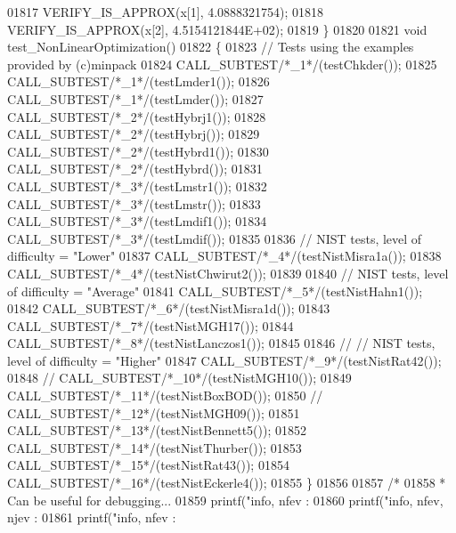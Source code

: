 \begin{DoxyCode}
01817   VERIFY\_IS\_APPROX(x[1], 4.0888321754);
01818   VERIFY\_IS\_APPROX(x[2], 4.5154121844E+02);
01819 \}
01820 
01821 \textcolor{keywordtype}{void} test\_NonLinearOptimization()
01822 \{
01823     \textcolor{comment}{// Tests using the examples provided by (c)minpack}
01824     CALL\_SUBTEST\textcolor{comment}{/*\_1*/}(testChkder());
01825     CALL\_SUBTEST\textcolor{comment}{/*\_1*/}(testLmder1());
01826     CALL\_SUBTEST\textcolor{comment}{/*\_1*/}(testLmder());
01827     CALL\_SUBTEST\textcolor{comment}{/*\_2*/}(testHybrj1());
01828     CALL\_SUBTEST\textcolor{comment}{/*\_2*/}(testHybrj());
01829     CALL\_SUBTEST\textcolor{comment}{/*\_2*/}(testHybrd1());
01830     CALL\_SUBTEST\textcolor{comment}{/*\_2*/}(testHybrd());
01831     CALL\_SUBTEST\textcolor{comment}{/*\_3*/}(testLmstr1());
01832     CALL\_SUBTEST\textcolor{comment}{/*\_3*/}(testLmstr());
01833     CALL\_SUBTEST\textcolor{comment}{/*\_3*/}(testLmdif1());
01834     CALL\_SUBTEST\textcolor{comment}{/*\_3*/}(testLmdif());
01835 
01836     \textcolor{comment}{// NIST tests, level of difficulty = "Lower"}
01837     CALL\_SUBTEST\textcolor{comment}{/*\_4*/}(testNistMisra1a());
01838     CALL\_SUBTEST\textcolor{comment}{/*\_4*/}(testNistChwirut2());
01839 
01840     \textcolor{comment}{// NIST tests, level of difficulty = "Average"}
01841     CALL\_SUBTEST\textcolor{comment}{/*\_5*/}(testNistHahn1());
01842     CALL\_SUBTEST\textcolor{comment}{/*\_6*/}(testNistMisra1d());
01843     CALL\_SUBTEST\textcolor{comment}{/*\_7*/}(testNistMGH17());
01844     CALL\_SUBTEST\textcolor{comment}{/*\_8*/}(testNistLanczos1());
01845 
01846 \textcolor{comment}{//     // NIST tests, level of difficulty = "Higher"}
01847     CALL\_SUBTEST\textcolor{comment}{/*\_9*/}(testNistRat42());
01848 \textcolor{comment}{//     CALL\_SUBTEST/*\_10*/(testNistMGH10());}
01849     CALL\_SUBTEST\textcolor{comment}{/*\_11*/}(testNistBoxBOD());
01850 \textcolor{comment}{//     CALL\_SUBTEST/*\_12*/(testNistMGH09());}
01851     CALL\_SUBTEST\textcolor{comment}{/*\_13*/}(testNistBennett5());
01852     CALL\_SUBTEST\textcolor{comment}{/*\_14*/}(testNistThurber());
01853     CALL\_SUBTEST\textcolor{comment}{/*\_15*/}(testNistRat43());
01854     CALL\_SUBTEST\textcolor{comment}{/*\_16*/}(testNistEckerle4());
01855 \}
01856 
01857 \textcolor{comment}{/*}
01858 \textcolor{comment}{ * Can be useful for debugging...}
01859 \textcolor{comment}{  printf("info, nfev : %
01860 \textcolor{comment}{  printf("info, nfev, njev : %
01861 \textcolor{comment}{  printf("info, nfev : %
}}}
\end{DoxyCode}
